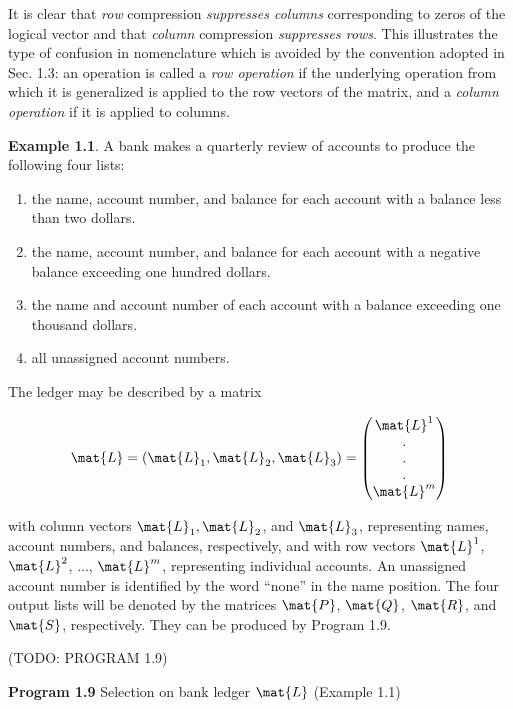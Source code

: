 \par It is clear that \textit{row} compression \textit{suppresses columns} corresponding to zeros of the logical vector and that \textit{column} compression \textit{suppresses rows}. This illustrates the type of confusion in nomenclature which is avoided by the convention adopted in Sec. 1.3: an operation is called a \textit{row operation} if the underlying operation from which it is generalized is applied to the row vectors of the matrix, and a \textit{column operation} if it is applied to columns.

\par \textbf{Example 1.1}. A bank makes a quarterly review of accounts to produce the following four lists:
\begin{enumerate}
  \item the name, account number, and balance for each account with a balance less than two dollars.
  \item the name, account number, and balance for each account with a negative balance exceeding one hundred dollars.
  \item the name and account number of each account with a balance exceeding one thousand dollars.
  \item all unassigned account numbers.
\end{enumerate}

\noindent The ledger may be described by a matrix

$$
  \mat{L}
    = (\mat{L}_1, \mat{L}_2, \mat{L}_3)
    = \begin{pmatrix} \mat{L}^1 \\.\\.\\.\\ \mat{L}^m \end{pmatrix}
$$

\noindent with column vectors $\mat{L}_1, \mat{L}_2$, and $\mat{L}_3$, representing names, account numbers, and balances, respectively, and with row vectors $\mat{L}^1$, $\mat{L}^2$, ..., $\mat{L}^m$, representing individual accounts. An unassigned account number is identified by the word ``none'' in the name position. The four output lists will be denoted by the matrices $\mat{P}$, $\mat{Q}$, $\mat{R}$, and $\mat{S}$, respectively. They can be produced by Program 1.9.


\par (TODO: PROGRAM 1.9)

\par \textbf{Program 1.9} Selection on bank ledger $\mat{L}$ (Example 1.1)

